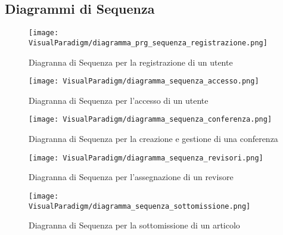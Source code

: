 \subsection{Diagrammi di Sequenza}
\label{sec:diagrammi_di_sequenza}
\begin{figure}[ht]
  \centering
  \texttt{[image: VisualParadigm/diagramma\_prg\_sequenza\_registrazione.png]}
  \caption{Diagranna di Sequenza per la registrazione di un utente}
  \label{fig:prg_sequenza_registrazione}
\end{figure}

\begin{figure}[ht]
  \centering
  \texttt{[image: VisualParadigm/diagramma\_sequenza\_accesso.png]}
  \caption{Diagranna di Sequenza per l'accesso di un utente}
  \label{fig:sequenza_accesso}
\end{figure}

\begin{figure}[ht]
  \centering
  \texttt{[image: VisualParadigm/diagramma\_sequenza\_conferenza.png]}
  \caption{Diagranna di Sequenza per la creazione e gestione di una conferenza}
  \label{fig:sequenza_conferenza}
\end{figure}

\begin{figure}[ht]
  \centering
  \texttt{[image: VisualParadigm/diagramma\_sequenza\_revisori.png]}
  \caption{Diagranna di Sequenza per l'assegnazione di un revisore}
  \label{fig:sequenza_assegnazione}
\end{figure}

\begin{figure}[ht]
  \centering
  \texttt{[image: VisualParadigm/diagramma\_sequenza\_sottomissione.png]}
  \caption{Diagranna di Sequenza per la sottomissione di un articolo}
  \label{fig:sequenza_sottomissione}
\end{figure}

